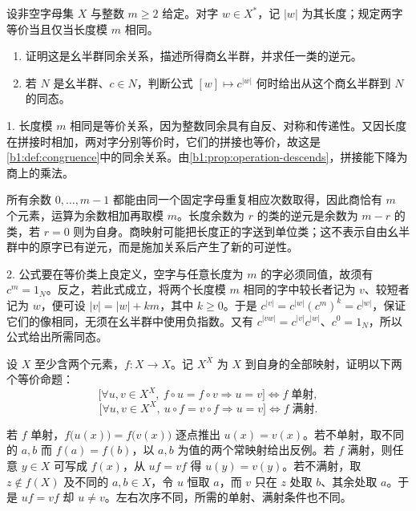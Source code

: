 \begin{exercise}\label{b1:ex:01-length-mod}
	设非空字母集 \(X\) 与整数 \(m\geq2\) 给定。对字 \(w\in X^*\)，记 \(|w|\) 为其长度；规定两字等价当且仅当长度模 \(m\) 相同。
	\begin{enumerate}
		\item 证明这是幺半群同余关系，描述所得商幺半群，并求任一类的逆元。
		\item 若 \(N\) 是幺半群、\(c\in N\)，判断公式 \([w]\mapsto c^{|w|}\) 何时给出从这个商幺半群到 \(N\) 的同态。
	\end{enumerate}
\end{exercise}
\begin{solution}
	1. 长度模 \(m\) 相同是等价关系，因为整数同余具有自反、对称和传递性。又因长度在拼接时相加，两对字分别等价时，它们的拼接也等价，故这是\cref{b1:def:congruence}中的同余关系。由\cref{b1:prop:operation-descends}，拼接能下降为商上的乘法。

	所有余数 \(0,\ldots,m-1\) 都能由同一个固定字母重复相应次数取得，因此商恰有 \(m\) 个元素，运算为余数相加再取模 \(m\)。长度余数为 \(r\) 的类的逆元是余数为 \(m-r\) 的类，若 \(r=0\) 则为自身。商映射可能把长度正的字送到单位类；这不表示自由幺半群中的原字已有逆元，而是施加关系后产生了新的可逆性。

	2. 公式要在等价类上良定义，空字与任意长度为 \(m\) 的字必须同值，故须有 \(c^m=1_N\)。反之，若此式成立，将两个长度模 \(m\) 相同的字中较长者记为 \(v\)、较短者记为 \(w\)，便可设 \(|v|=|w|+km\)，其中 \(k\geq0\)。于是 \(c^{|v|}=c^{|w|}(c^m)^k=c^{|w|}\)，保证它们的像相同，无须在幺半群中使用负指数。又有 \(c^{|vw|}=c^{|v|}c^{|w|}\)、\(c^0=1_N\)，所以公式给出所需同态。
\end{solution}

\begin{exercise}\label{b1:ex:01-transform-cancel}
	设 \(X\) 至少含两个元素，\(f:X\rightarrow X\)。记 \(X^X\) 为 \(X\) 到自身的全部映射，证明以下两个等价命题：
	\[
		\bigl[\forall u,v\in X^X,\ f\circ u=f\circ v\Rightarrow u=v\bigr] \iff f\;\text{单射},
	\]
	\[
		\bigl[\forall u,v\in X^X,\ u\circ f=v\circ f\Rightarrow u=v\bigr] \iff f\;\text{满射}.
	\]
\end{exercise}
\begin{solution}
	若 \(f\) 单射，\(f\bigl(u(x)\bigr)=f\bigl(v(x)\bigr)\) 逐点推出 \(u(x)=v(x)\)。若不单射，取不同的 \(a,b\) 而 \(f(a)=f(b)\)，以 \(a,b\) 为值的两个常映射给出反例。若 \(f\) 满射，则任意 \(y\in X\) 可写成 \(f(x)\)，从 \(uf=vf\) 得 \(u(y)=v(y)\)。若不满射，取 \(z\notin f(X)\) 及不同的 \(a,b\in X\)，令 \(u\) 恒取 \(a\)，而 \(v\) 只在 \(z\) 处取 \(b\)、其余处取 \(a\)。于是 \(uf=vf\) 却 \(u\ne v\)。左右次序不同，所需的单射、满射条件也不同。
\end{solution}

